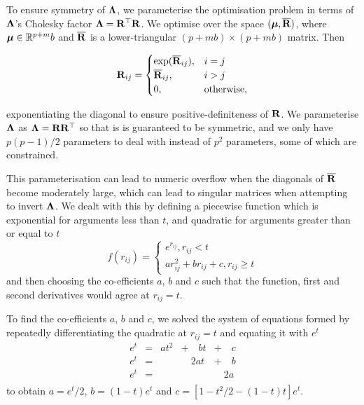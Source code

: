 \documentclass{amsart}[12pt]
\begin{document}
			To ensure symmetry of ${\boldsymbol \Lambda}$, we parameterise the optimisation problem in terms of ${\boldsymbol \Lambda}$'s
			Cholesky factor  ${\boldsymbol \Lambda} = {\bf R}^\top {\bf R}$. We optimise over the space $({\boldsymbol \mu}, \overline{{\bf R}})$, where ${\boldsymbol \mu}
			\in {\mathbb{R}}^{p + m}b$ and $\overline{{\bf R}}$ is a lower-triangular $(p + mb) \times (p + mb)$ matrix. Then
					
			\begin{equation*}
				{\bf R}_{ij} =
				\begin{cases}
					\exp(\overline{{\bf R}}_{ij}), & i = j             \\
					\overline{{\bf R}}_{ij},       & i > j             \\
					0,                         & \text{otherwise}, 
				\end{cases}
			\end{equation*}
					
			\noindent exponentiating the diagonal to ensure positive-definiteness of ${\bf R}$. We parameterise ${\boldsymbol \Lambda}$
			as ${\boldsymbol \Lambda} = {\bf R} {\bf R}^\top$ so that is is guaranteed to be symmetric, and we only have $p(p-1)/2$ 
			parameters to deal with instead of $p^2$ parameters, some of which are constrained. 
			
			This parameterisation can lead to numeric overflow when the diagonals of $\overline{{\bf R}}$ become moderately
			large, which can lead to singular matrices when attempting to invert ${\boldsymbol \Lambda}$. We dealt with this by
			defining a piecewise function which is exponential for arguments less than $t$, and quadratic for arguments
			greater than or equal to $t$
			$$
			f(r_{ij}) =
			\begin{cases}
				e^{r_{ij}}, r_{ij} < t                   \\
				a r_{ij}^2 + b r_{ij} + c, r_{ij} \geq t 
			\end{cases}
			$$
			and then choosing the co-efficients $a$, $b$ and $c$ such that the function, first and second derivatives would
			agree at $r_{ij} = t$.
			
			To find the co-efficients $a$, $b$ and $c$, we solved the system of equations formed by repeatedly 
			differentiating the quadratic at $r_{ij} =  t$ and equating it with $e^t$
			$$
			\begin{array}{lllll}
				e^t & = & a t^2 & + \quad b t & + \quad c \\
				e^t & = &       & \quad 2a t  & + \quad b \\
				e^t & = &       &             & \quad 2a  \\
			\end{array}
			$$
			to obtain $a = e^t / 2$, $b = (1 - t) e^t$ and $c = [1 - t^2/2 - (1 - t) t] e^t$.
			
\end{document}
